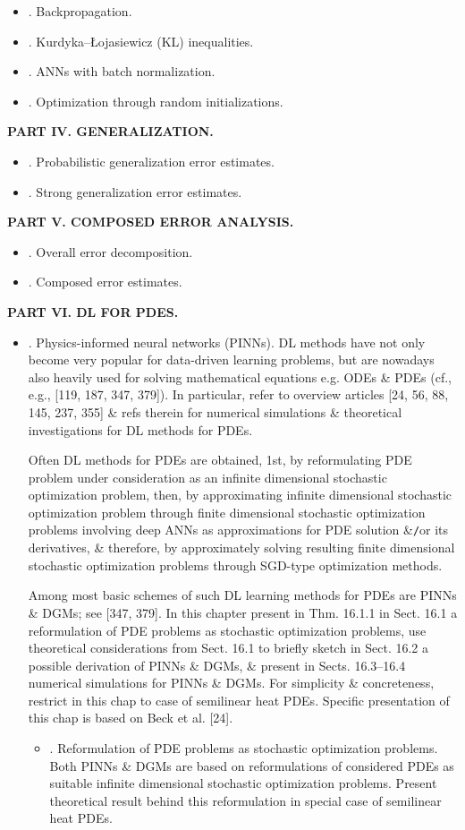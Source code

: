 \documentclass{article}
\begin{document}
\begin{enumerate}
\begin{itemize}
		\item {. Backpropagation.}
		\item {. Kurdyka--\L ojasiewicz (KL) inequalities.}
		\item {. ANNs with batch normalization.}
		\item {. Optimization through random initializations.}
	\end{itemize}
	{\bf PART IV. GENERALIZATION.}
	\begin{itemize}
		\item {. Probabilistic generalization error estimates.}
		\item {. Strong generalization error estimates.}
	\end{itemize}
	{\bf PART V. COMPOSED ERROR ANALYSIS.}
	\begin{itemize}
		\item {. Overall error decomposition.}
		\item {. Composed error estimates.}
	\end{itemize}
	{\bf PART VI. DL FOR PDES.}
	\begin{itemize}
		\item {. Physics-informed neural networks (PINNs).} DL methods have not only become very popular for data-driven learning problems, but are nowadays also heavily used for solving mathematical equations e.g. ODEs \& PDEs (cf., e.g., [119, 187, 347, 379]). In particular, refer to overview articles [24, 56, 88, 145, 237, 355] \& refs therein for numerical simulations \& theoretical investigations for DL methods for PDEs.
		
		Often DL methods for PDEs are obtained, 1st, by reformulating PDE problem under consideration as an infinite dimensional stochastic optimization problem, then, by approximating infinite dimensional stochastic optimization problem through finite dimensional stochastic optimization problems involving deep ANNs as approximations for PDE solution \&{\tt/}or its derivatives, \& therefore, by approximately solving resulting finite dimensional stochastic optimization problems through SGD-type optimization methods.
		
		Among most basic schemes of such DL learning methods for PDEs are PINNs \& DGMs; see [347, 379]. In this chapter present in Thm. 16.1.1 in Sect. 16.1 a reformulation of PDE problems as stochastic optimization problems, use theoretical considerations from Sect. 16.1 to briefly sketch in Sect. 16.2 a possible derivation of PINNs \& DGMs, \& present in Sects. 16.3--16.4 numerical simulations for PINNs \& DGMs. For simplicity \& concreteness, restrict in this chap to case of semilinear heat PDEs. Specific presentation of this chap is based on Beck et al. [24].
		\begin{itemize}
			\item {. Reformulation of PDE problems as stochastic optimization problems.} Both PINNs \& DGMs are based on reformulations of considered PDEs as suitable infinite dimensional stochastic optimization problems. Present theoretical result behind this reformulation in special case of semilinear heat PDEs.
			

\end{itemize}
\end{itemize}
\end{enumerate}
\end{document}
